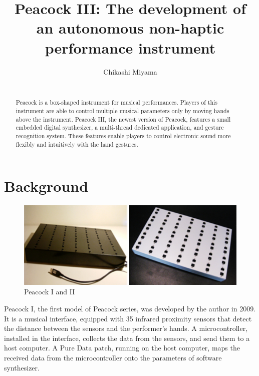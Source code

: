 \documentclass{nime-alternate}
\begin{document}
\title{Peacock III: The development of an autonomous non-haptic performance instrument}
\author{
\alignauthor
Chikashi Miyama\\
       \\
}

\maketitle
\begin{abstract}
Peacock is a box-shaped instrument for musical performances. Players of this instrument are able to control multiple musical parameters only by moving hands above the instrument. Peacock III, the newest version of Peacock, features a small embedded digital synthesizer, a multi-thread dedicated application, and gesture recognition system. These features enable players to control electronic sound more flexibly and intuitively with the hand gestures.
\end{abstract}

\section{Background}

\begin{figure}[htbp]
       \begin{center}
              \includegraphics[scale = 0.55]{Peacocks.pdf}
       \end{center}
       \caption{Peacock I and II}
       \label{fig:old_peacock}
\end{figure}

Peacock I, the first model of Peacock series, was developed by the author in 2009\cite{miyama:peacock}. It is a musical interface, equipped with 35 infrared proximity sensors that detect the distance between the sensors and the performer's hands. A microcontroller, installed in the interface, collects the data from the sensors, and send them to a host computer. A Pure Data\cite{Pd} patch, running on the host computer, maps the received data from the microcontroller onto the parameters of software synthesizer.
\end{document}
